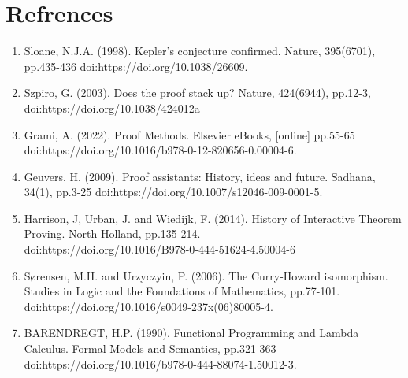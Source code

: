 \documentclass{article}
\begin{document}
\section{Refrences}
\begin{enumerate}
    \item Sloane, N.J.A. (1998). Kepler's conjecture confirmed. Nature, 395(6701), pp.435\hyp{}436 doi:https://doi.org/10.1038/26609.
    \item Szpiro, G. (2003). Does the proof stack up? Nature, 424(6944), pp.12\hyp{}3,  doi:https://doi.org/10.1038/424012a
    \item Grami, A. (2022). Proof Methods. Elsevier eBooks, [online] pp.55\hyp{}65\\doi:https://doi.org/10.1016/b978-0-12-820656-0.00004-6.
    \item Geuvers, H. (2009). Proof assistants: History, ideas and future. Sadhana, 34(1), pp.3\hyp{}25 doi:https://doi.org/10.1007/s12046-009-0001-5.
    \item Harrison, J, Urban, J. and Wiedijk, F. (2014). History of Interactive Theorem Proving. North-Holland, pp.135\hyp{}214.\\doi:https://doi.org/10.1016/B978-0-444-51624-4.50004-6
    \item Sørensen, M.H. and Urzyczyin, P. (2006). The Curry-Howard isomorphism. Studies in Logic and the Foundations of Mathematics, pp.77\hyp{}101.\\doi:https://doi.org/10.1016/s0049-237x(06)80005-4.
    \item BARENDREGT, H.P. (1990). Functional Programming and Lambda Calculus. Formal Models and Semantics, pp.321\hyp{}363 \\doi:https://doi.org/10.1016/b978-0-444-88074-1.50012-3.

\end{enumerate} 
\end{document}
